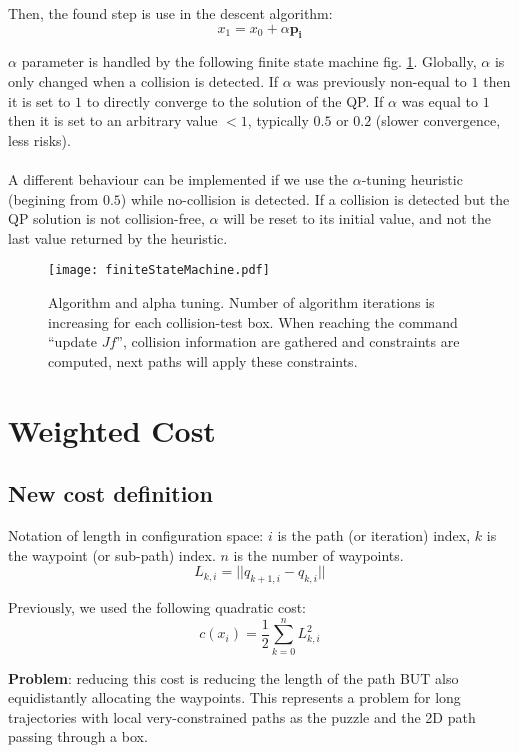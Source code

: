 \documentclass {article}
\newcommand\p{\mathbf{p_i}}
\begin{document}
\vspace{0.4cm}

Then, the found step is use in the descent algorithm:
$$ x_1 = x_0 + \alpha\p $$

$\alpha$ parameter is handled by the following finite state machine fig.
\ref{fig:finiteStateMachine}. Globally, $\alpha$ is only changed when a collision
is detected. If $\alpha$ was previously non-equal to $1$ then it is set to $1$
to directly converge to the solution of the QP. If $\alpha$ was equal to $1$
then it is set to an arbitrary value $<1$, typically $0.5$ or $0.2$ (slower
convergence, less risks). \\
\\
A different behaviour can be implemented if we use the $\alpha$-tuning
heuristic (begining from $0.5$) while no-collision is detected. If a collision
is detected but the QP solution is not collision-free, $\alpha$ will be reset
to its initial value, and not the last value returned by the heuristic.

\begin{figure}[H]
	\centering
	\texttt{[image: finiteStateMachine.pdf]}
	\caption{Algorithm and alpha tuning. Number of algorithm iterations is
increasing for each collision-test box. When reaching the command
``update $Jf$'', collision information are gathered and constraints are
computed, next paths will apply these constraints.}
	\label{fig:finiteStateMachine}
\end{figure}

\newpage

\section{Weighted Cost}
\subsection{New cost definition}
Notation of length in configuration space: $i$ is the path (or iteration) index,
$k$ is the waypoint (or sub-path) index. $n$ is the number of waypoints.
$$
L_{k,i} = || q_{k+1,i} - q_{k,i} ||
$$

Previously, we used the following quadratic cost:
$$
c(x_i) = \frac{1}{2}\sum_{k=0}^n {L_{k,i}^2}
$$

\textbf{Problem}: reducing this cost is reducing the length of the path BUT also
equidistantly allocating the waypoints. This represents a problem for long
trajectories with local very-constrained paths as the puzzle and the 2D path
passing through a box.
\end{document}
